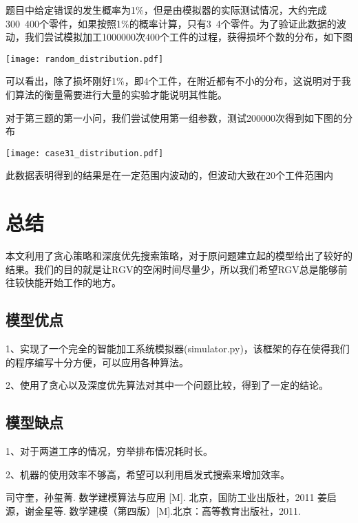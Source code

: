 \documentclass{cumcmthesis}
\begin{document}
题目中给定错误的发生概率为1\%，但是由模拟器的实际测试情况，大约完成300~400个零件，如果按照1\%的概率计算，只有3~4个零件。为了验证此数据的波动，我们尝试模拟加工1000000次400个工件的过程，获得损坏个数的分布，如下图

\begin{center}
	\texttt{[image: random\_distribution.pdf]}
\end{center}

可以看出，除了损坏刚好1\%，即4个工件，在附近都有不小的分布，这说明对于我们算法的衡量需要进行大量的实验才能说明其性能。

对于第三题的第一小问，我们尝试使用第一组参数，测试200000次得到如下图的分布

\begin{center}
	\texttt{[image: case31\_distribution.pdf]}
\end{center}

此数据表明得到的结果是在一定范围内波动的，但波动大致在20个工件范围内

\section{总结}

本文利用了贪心策略和深度优先搜索策略，对于原问题建立起的模型给出了较好的结果。我们的目的就是让RGV的空闲时间尽量少，所以我们希望RGV总是能够前往较快能开始工作的地方。

\subsection{模型优点}

1、实现了一个完全的智能加工系统模拟器(simulator.py)，该框架的存在使得我们的程序编写十分方便，可以应用各种算法。

2、使用了贪心以及深度优先算法对其中一个问题比较，得到了一定的结论。

\subsection{模型缺点}

1、对于两道工序的情况，穷举排布情况耗时长。

2、机器的使用效率不够高，希望可以利用启发式搜索来增加效率。

\begin{thebibliography}{9}%
 司守奎，孙玺菁. 数学建模算法与应用 [M]. 北京，国防工业出版社，2011
 姜启源，谢金星等. 数学建模（第四版）[M].北京：高等教育出版社，2011.
\end{thebibliography}
\end{document}
